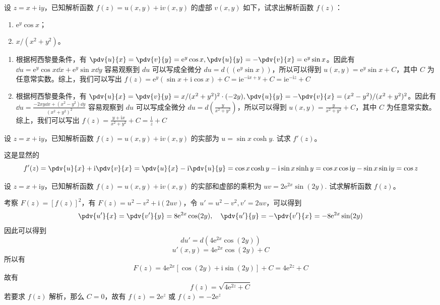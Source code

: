 \newcommand{\ee}{\mathrm{e}}
\newcommand{\ii}{\mathrm{i}}

\begin{question}
设 \(z = x + \ii y\)，已知解析函数 \(f(z)=u(x,y) + \ii v(x,y)\) 的虚部 \(v(x,y)\) 如下，试求出解析函数 \(f(z)\)：
\begin{enumerate}
    \item \(\ee^y \cos x\)；
    \item \(x/(x^2+y^2)\)。
\end{enumerate}
\begin{solution}
\begin{enumerate}
    \item 根据柯西黎曼条件，有 \(\pdv{u}{x} = \pdv{v}{y} = \ee^y \cos x, \pdv{u}{y}= -\pdv{v}{x}=\ee^y \sin x \)。因此有 \( \dd{u} = \ee^y \cos x \dd{x} + \ee^y \sin x \dd{y} \) 容易观察到 \(du\) 可以写成全微分 \(du = d(( \ee^y \sin x))\)，所以可以得到 \(u(x,y)= \ee^y \sin x +C\)，其中 \(C\) 为任意常实数。综上，我们可以写出 \( f(z)=\ee^y (\sin x + \ii  \cos x) + C = \ii \ee^{-\ii x +y} + C=\ii \ee^{-\ii z} + C  \)
    \item 根据柯西黎曼条件，有 \(\pdv{u}{x}=\pdv{v}{y}=x/(x^2+y^2)^2 \cdot (-2y), \pdv{u}{y}=-\pdv{v}{x}=(x^2-y^2)/(x^2+y^2)^2\)。因此有\( \dd{u} = \frac{-2x y \dd{x} +(x^2 - y^2) \dd{y}}{(x^2+y^2)^2} \) 容易观察到 \(du\) 可以写成全微分 \(du=d(\frac{y}{x^2 + y^2})\)，所以可以得到 \(u(x,y)=\frac{y}{x^2+y^2}+C\)，其中 \(C\) 为任意常实数。综上，我们可以写出 \( f(z)=\frac{y+\ii x}{x^2+y^2} + C=\frac{\ii}{z} + C \)
\end{enumerate}
\end{solution}
\end{question}

\begin{question}
设 \(z = x+\ii y\)，已知解析函数 \(f(z)=u(x,y)+\ii v(x,y)\) 的实部为 \( u = \sin x \cosh y. \)
试求 \(f'(z)\)。
\begin{solution}
这是显然的 \[
f'(z) = \pdv{u}{x} + \ii \pdv{v}{x} = \pdv{u}{x} -\ii \pdv{u}{y}
= \cos x \cosh y -\ii \sin x \sinh y
= \cos x \cos \ii y - \sin x \sin \ii y
= \cos z
\]
\end{solution}
\end{question}

\begin{question}
设 \(z=x+\ii y\)，已知解析函数 \(f(z)=u(x,y)+\ii v(x,y)\) 的实部和虚部的乘积为 \( u v = 2\ee^{2x} \sin(2y). \)
试求解析函数 \(f(z)\)。
\begin{solution}
考察 \(F(z)= [f(z)]^2\)，有 \(F(z)=u^2 - v^2 + \ii (2u v)\)，令 \(u'=u^2-v^2,v'=2u v\)，可以得到 \[
\pdv{u'}{x}=\pdv{v'}{y}=8 \ee ^{2x} \cos (2y), \quad \pdv{u'}{y}=-\pdv{v'}{x}=-8\ee^{2x} \sin(2y)
\]
因此可以得到 \[
du'=d(4\ee^{2x} \cos (2y))
\]
\[
u'(x,y)=4 \ee^{2x} \cos(2y) + C
\]
所以有 \[
F(z)= 4 \ee^{2x} [\cos(2y) + \ii \sin(2y)] + C=4 \ee ^{2z} + C
\]
故有 \[
f(z) =\sqrt{4 \ee^{2z} + C}
\]
若要求 \(f(z)\) 解析，那么 \(C=0\)，故有 \( f(z) =2\ee^{z}\) 或 \(f(z) = -2\ee^z \)
\end{solution}
\end{question}


